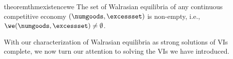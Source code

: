 \begin{restatable}{theorem}{thmexistencewe}\label{thm:existence_we}
    The set of Walrasian equilibria of any continuous competitive economy $(\numgoods, \excessset)$ is non-empty, i.e., $\we(\numgoods, \excessset) \neq \emptyset$.
\end{restatable}

With our characterization of Walrasian equilibria as strong solutions of VIs complete, we now turn our attention to solving the VIs we have introduced.
    



